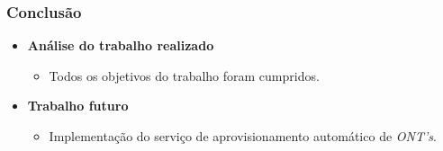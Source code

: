 \begin{frame}
    \frametitle{Conclusão}
    \begin{itemize}
        \item \textbf{Análise do trabalho realizado}
        \begin{itemize}
            \item Todos os objetivos do trabalho foram cumpridos.
        \end{itemize}    
        \item \textbf{Trabalho futuro}
        \begin{itemize}
            \item Implementação do serviço de aprovisionamento automático de
            \textit{ONT's}.
        \end{itemize}    
    \end{itemize}    
\end{frame}